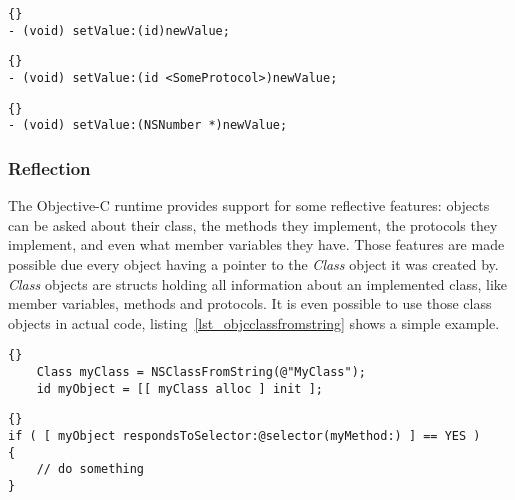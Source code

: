 \begin{lstlisting}[captionpos=b, caption=Argument without type information.,
label=lst_objctypesnoinfo]{}
- (void) setValue:(id)newValue;
\end{lstlisting}

\begin{lstlisting}[captionpos=b, caption=Argument with protocol type
information.,
label=lst_objctypesprotocolinfo]{}
- (void) setValue:(id <SomeProtocol>)newValue;
\end{lstlisting}

\begin{lstlisting}[captionpos=b, caption=Argument with class type information.,
label=lst_objctypesclasslinfo]{}
- (void) setValue:(NSNumber *)newValue;
\end{lstlisting}

\subsubsection{Reflection}
The Objective-C runtime provides support for some reflective features: objects
can be asked about their class, the methods they implement, the protocols they
implement, and even what member variables they have. Those features are made
possible due every object having a pointer to the \textit{Class} object it was
created by. \textit{Class} objects are structs holding all information about an
implemented class, like member variables, methods and protocols. It is even
possible to use those class objects in actual code,
listing~\ref{lst_objcclassfromstring} shows a simple example.

\begin{lstlisting}[captionpos=b, caption=Creating an object of a class given
only the class name., label=lst_objcclassfromstring, morekeywords={Class}]{}
    Class myClass = NSClassFromString(@"MyClass");
    id myObject = [[ myClass alloc ] init ];
\end{lstlisting}

\begin{lstlisting}[captionpos=b, caption=Check if an object responds to a
specific message.,
label=lst_objcinstancerespindstoselector]{}
if ( [ myObject respondsToSelector:@selector(myMethod:) ] == YES )
{
    // do something
}
\end{lstlisting}

